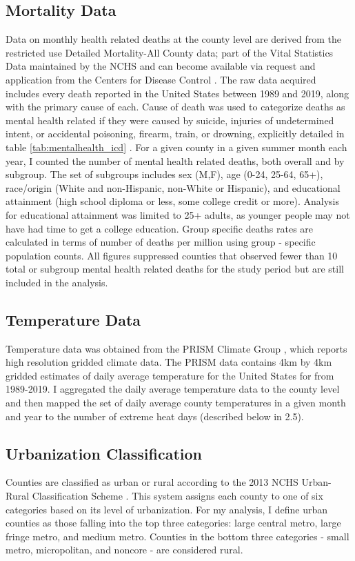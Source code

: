 \documentclass[12pt, a4paper]{article}
\begin{document}
\subsection{Mortality Data}
Data on monthly health related deaths at the county level are derived from the restricted use Detailed Mortality-All County data; part of the Vital Statistics Data maintained by the NCHS and can become available via request and application from the Centers for Disease Control \cite{nchsRestrictedData2021}. The raw data acquired includes every death reported in the United States between 1989 and 2019, along with the primary cause of each. Cause of death was used to categorize deaths as mental health related if they were caused by suicide, injuries of undetermined intent, or accidental poisoning, firearm, train, or drowning, explicitly detailed in table \ref{tab:mentalhealth_icd} \cite{MHClassification}. For a given county in a given summer month each year, I counted the number of mental health related deaths, both overall and by subgroup. The set of subgroups includes sex (M,F), age (0-24, 25-64, 65+), race/origin (White and non-Hispanic, non-White or Hispanic), and educational attainment (high school diploma or less, some college credit or more). Analysis for educational attainment was limited to 25+ adults, as younger people may not have had time to get a college education. Group specific deaths rates are calculated in terms of number of deaths per million using group - specific population counts. All figures suppressed counties that observed fewer than 10 total or subgroup mental health related deaths for the study period but are still included in the analysis.

\subsection{Temperature Data}
Temperature data was obtained from the PRISM Climate Group \cite{prismClimate2022}, which reports high resolution gridded climate data. The PRISM data contains 4km by 4km gridded estimates of daily average temperature for the United States for from 1989-2019. I aggregated the daily average temperature data to the county level and then mapped the set of daily average county temperatures in a given month and year to the number of extreme heat days (described below in 2.5).

\subsection{Urbanization Classification}
Counties are classified as urban or rural according to the 2013 NCHS Urban-Rural Classification Scheme \cite{nchsUrbanRural2013}. This system assigns each county to one of six categories based on its level of urbanization. For my analysis, I define urban counties as those falling into the top three categories: large central metro, large fringe metro, and medium metro. Counties in the bottom three categories - small metro, micropolitan, and noncore - are considered rural.
\end{document}
